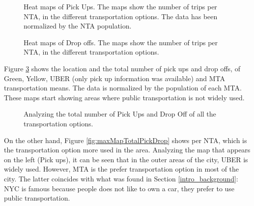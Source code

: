 \begin{figure}%
\centering
{}%
\qquad
{}
%
\caption{Heat maps of Pick Ups. The maps show the number of trips per NTA, in the different transportation options. The data has been normalized by the NTA population.}
\label{fig:heatMapTripsPick}%
\end{figure}


\begin{figure}%
\centering
{}
\qquad
{}
%
\caption{Heat maps of Drop offs. The maps show the number of trips per NTA, in the different transportation options. }
\label{fig:heatMapTripsDrop}%
\end{figure}





Figure \ref{fig:heatMapTotalPickDrop} shows the location and the total number of pick ups and drop offs, of Green, Yellow, UBER (only pick up information was available) and MTA transportation means. The data is normalized by the population of each MTA. These maps start showing areas where public transportation is not widely used.


\begin{figure}%
\centering
{}
\qquad
{}
\caption{Analyzing the total number of Pick Ups and Drop Off of all the transportation options. }
\label{fig:heatMapTotalPickDrop}%
\end{figure}



On the other hand, Figure \ref{fig:maxMapTotalPickDrop} shows per NTA, which is the transportation option more used in the area. Analyzing the map that appears on the left (Pick ups), it can be seen that in the outer areas of the city, UBER is widely used. However, MTA is the prefer transportation option in most of the city. The latter coincides with what was found in Section \ref{intro_background}: NYC is famous because people does not like to own a car, they prefer to use public transportation.


